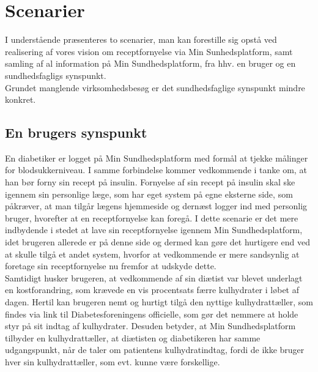 \section{Scenarier} 
I understående præsenteres to scenarier, man kan forestille sig opstå ved realisering af vores vision om receptfornyelse via Min Sunhedsplatform, samt samling af al information 
 på Min Sundhedsplatform, fra hhv. en bruger og en sundhedsfagligs synspunkt. \\
 Grundet manglende virksomhedsbesøg er det sundhedsfaglige synspunkt mindre konkret. 

\subsection{En brugers synspunkt}
En diabetiker er logget på Min Sundhedsplatform med formål at tjekke målinger for blodsukkerniveau. I samme forbindelse kommer vedkommende i tanke om, at han bør forny sin recept på insulin. Fornyelse af sin recept på insulin skal ske igennem sin personlige læge, som har eget system på egne eksterne side, som påkræver, at man tilgår lægens hjemmeside og dernæst logger ind med personlig bruger, hvorefter at en receptfornyelse kan foregå. I dette scenarie er det mere indbydende i stedet at lave sin receptfornyelse igennem Min Sundhedsplatform, idet brugeren allerede er på denne side og dermed kan gøre det hurtigere end ved at skulle tilgå et andet system, hvorfor at vedkommende er mere sandsynlig at foretage sin receptfornyelse nu fremfor at udskyde dette.\\
Samtidigt husker brugeren, at vedkommende af sin diætist var blevet underlagt en kostforandring, som krævede en vis procentsats færre kulhydrater i løbet af dagen. Hertil kan brugeren nemt og hurtigt tilgå den nyttige kulhydrattæller, som findes via link til Diabetesforeningens officielle, som gør det nemmere at holde styr på sit indtag af kulhydrater. Desuden betyder, at Min Sundhedsplatform tilbyder en kulhydrattæller, at diætisten og diabetikeren har samme udgangspunkt, når de taler om patientens kulhydratindtag, fordi de ikke bruger hver sin kulhydrattæller, som evt. kunne være forskellige. 


